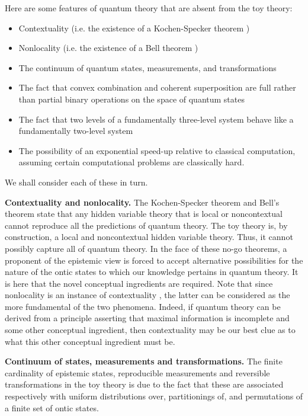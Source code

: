 \documentclass[pra,nofootinbib,showpacs,12pt]{revtex4}
\begin{document}
Here are some features of quantum theory that are absent from the toy theory:

\begin{itemize}
\item Contextuality (i.e. the existence of a Kochen-Specker theorem \cite%
{Bell,KochenSpecker})

\item Nonlocality (i.e. the existence of a Bell theorem \cite{Bell2})

\item The continuum of quantum states, measurements, and transformations

\item The fact that convex combination and coherent superposition are full
rather than partial binary operations on the space of quantum states

\item The fact that two levels of a fundamentally three-level system behave
like a fundamentally two-level system

\item The possibility of an exponential speed-up relative to classical
computation, assuming certain computational problems are classically hard.
\end{itemize}

We shall consider each of these in turn.

\textbf{Contextuality and nonlocality. }The Kochen-Specker theorem \cite%
{Bell,KochenSpecker} and Bell's theorem \cite{Bell2} state that any hidden
variable theory that is local or noncontextual cannot reproduce all the
predictions of quantum theory. The toy theory is, by construction, a local
and noncontextual hidden variable theory. Thus, it cannot possibly capture
all of quantum theory. In the face of these no-go theorems, a proponent of
the epistemic view is forced to accept alternative possibilities for the
nature of the ontic states to which our knowledge pertains in quantum
theory. It is here that the novel conceptual ingredients are required. Note
that since nonlocality is an instance of contextuality \cite{Mermin}, the
latter can be considered as the more fundamental of the two phenomena.
Indeed, if quantum theory can be derived from a principle asserting that
maximal information is incomplete and some other conceptual ingredient, then
contextuality may be our best clue as to what this other conceptual
ingredient must be.

\textbf{Continuum of states, measurements and transformations. }
The finite cardinality of epistemic states, reproducible
measurements and reversible transformations in the toy theory is
due to the fact that these are associated respectively with
uniform distributions over, partitionings of, and permutations of
a finite set of ontic states.
\end{document}
